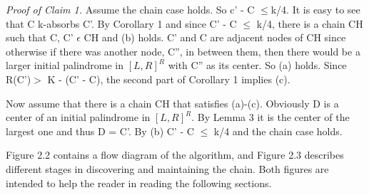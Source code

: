 \documentclass[11pt,a4paper]{report}
\begin{document}
\emph{Proof of Claim 1.} Assume the chain case holds. So c’ - C $\leq $k/4. It is easy to see
that C k-absorbs C’. By Corollary 1 and since C’ - C $\leq$ k/4, there is a chain CH such
that C, C’ $\epsilon $ CH and (b) holds. C’ and C are adjacent nodes of CH since otherwise if
there was another node, C”, in between them, then there would be a larger initial palindrome in $[L, R]^R$ with C”
 as its center. So (a) holds. Since R(C’)$ >$ K - (C’ - C), the second part of Corollary 1 implies (c).

Now assume that there is a chain CH that satisfies (a)-(c). Obviously D is a center of an
initial palindrome in $[L,R]^R$. By Lemma 3 it is the center of the largest one and thus
D = C’. By (b) C’ - C $\leq$ k/4 and the chain case holds. 

Figure 2.2 contains a flow diagram of the algorithm, and Figure 2.3 describes different
stages in discovering and maintaining the chain. Both figures are intended to help the
reader in reading the following sections.
\end{document}
